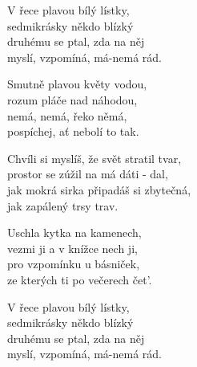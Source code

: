 
\ve
{}V řece plavou bílý lístky,\\
sedmikrásky někdo blízký\\
druhému se ptal, zda na něj\\
myslí, vzpomíná, má-nemá rád.

\ve
Smutně plavou květy vodou,\\
rozum pláče nad náhodou,\\
nemá, nemá, řeko němá,\\
pospíchej, ať nebolí to tak.

\cho{}
Chvíli si myslíš, že svět stratil tvar,\\
prostor se zúžil na má dáti - dal,\\
jak mokrá sirka připadáš si zbytečná,\\
jak zapálený trsy trav.

\ve
Uschla kytka na kamenech,\\
vezmi ji a v knížce nech ji,\\
pro vzpomínku u básniček,\\
ze kterých ti po večerech čet'.

\cho{} 

\ve
V řece plavou bílý lístky,\\
sedmikrásky někdo blízký\\
druhému se ptal, zda na něj \\
myslí, vzpomíná, má-nemá rád.

\esong